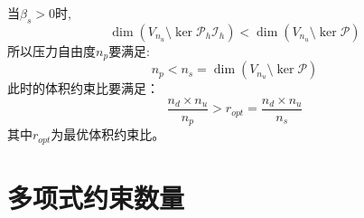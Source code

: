 当$\beta_s>0$时,
\begin{equation}
    \dim(V_{n_u}\setminus\ker \mathcal P_h \mathcal I_h) < \dim(V_{n_u}\setminus \ker \mathcal P)
\end{equation}
所以压力自由度$n_p$要满足:
\begin{equation}
    n_p<n_s = \dim(V_{n_u}\setminus \ker \mathcal P)
\end{equation}
此时的体积约束比要满足：
\begin{equation}
\frac{n_d\times n_u}{n_p}>r_{opt}=\frac{n_d\times n_u}{n_s}
\end{equation}
其中$r_{opt}$为最优体积约束比。
\section{多项式约束数量}

